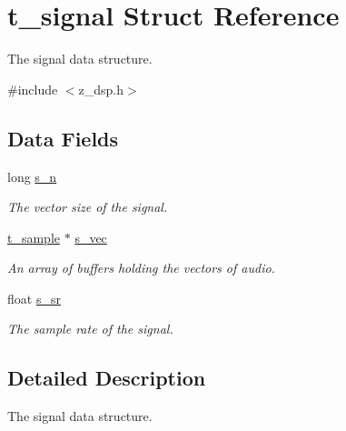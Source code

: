 \hypertarget{structt__signal}{
\section{t\_\-signal Struct Reference}
\label{structt__signal}
}


The signal data structure.  


{\ttfamily \#include $<$z\_\-dsp.h$>$}\subsection*{Data Fields}
\begin{DoxyCompactItemize}
\item 
\hypertarget{structt__signal_a86521ceba2d33ef53905ba51a3e3b5d6}{
long \hyperlink{structt__signal_a86521ceba2d33ef53905ba51a3e3b5d6}{s\_\-n}}
\label{structt__signal_a86521ceba2d33ef53905ba51a3e3b5d6}

\begin{DoxyCompactList}\small\item\em The vector size of the signal. \item\end{DoxyCompactList}\item 
\hypertarget{structt__signal_a9c265e1255c3648ee5a742d6635211ef}{
\hyperlink{group__msp_ga8ecd36423b35083714b8740c40b57120}{t\_\-sample} $\ast$ \hyperlink{structt__signal_a9c265e1255c3648ee5a742d6635211ef}{s\_\-vec}}
\label{structt__signal_a9c265e1255c3648ee5a742d6635211ef}

\begin{DoxyCompactList}\small\item\em An array of buffers holding the vectors of audio. \item\end{DoxyCompactList}\item 
\hypertarget{structt__signal_a50f7f2a3d62cbdcb51b2aeaab009cacf}{
float \hyperlink{structt__signal_a50f7f2a3d62cbdcb51b2aeaab009cacf}{s\_\-sr}}
\label{structt__signal_a50f7f2a3d62cbdcb51b2aeaab009cacf}

\begin{DoxyCompactList}\small\item\em The sample rate of the signal. \item\end{DoxyCompactList}\end{DoxyCompactItemize}


\subsection{Detailed Description}
The signal data structure. 